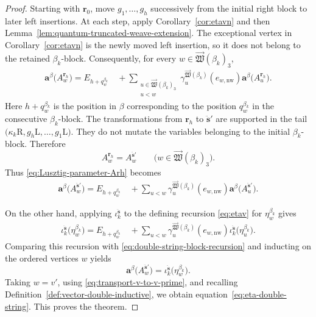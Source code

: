 \documentclass[12pt, reqno]{amsart}
\theoremstyle{plain}
\theoremstyle{definition}
\numberwithin{equation}{section}
\begin{document}
\begin{proof}
Starting with \(\mathbf r_0\), move
\(g_1,\ldots,g_h\) successively from the initial right block to
later left insertions. At each step, apply
Corollary~\ref{cor:etavn} and then
Lemma~\ref{lem:quantum-truncated-weave-extension}. The exceptional
vertex in Corollary~\ref{cor:etavn} is the newly moved left
insertion, so it does not belong to the retained \(\beta_k\)-block.
Consequently, for every
\(w\in\overrightarrow{\mathfrak W}(\beta_k)_3\),
\begin{equation}\label{eq:Lusztig-parameter-Arh}
\begin{aligned}
    \mathbf a^\beta\bigl(A_w^{\mathbf r_h}\bigr)
    =
    E_{h+q_w^{\beta_k}}\quad+
    \sum_{\substack{
        u\in\overrightarrow{\mathfrak W}(\beta_k)_3\\
        u<w
    }}
    \gamma_u^{\overrightarrow{\mathfrak W}(\beta_k)}
        (e_{w,\mathrm{nw}})
    \mathbf a^\beta\bigl(A_u^{\mathbf r_h}\bigr).
\end{aligned}
\end{equation}
Here \(h+q_w^{\beta_k}\) is the position in \(\beta\) corresponding
to the position \(q_w^{\beta_k}\) in the consecutive
\(\beta_k\)-block. The transformations from \(\mathbf r_h\) to
\(\ddot{\mathbf s}'\) are supported in the tail
\(
    \bigl(
       \kappa_k\mathrm R,
       g_h\mathrm L,\ldots,g_1\mathrm L
    \bigr).
\)
They do not mutate the variables belonging to the initial
\(\beta_k\)-block. Therefore
\[
    A_w^{\mathbf r_h}
    =
    A_w^{\ddot{\mathbf s}'}
    \qquad
    \bigl(
      w\in\overrightarrow{\mathfrak W}(\beta_k)_3
    \bigr).
\]
Thus \eqref{eq:Lusztig-parameter-Arh} becomes
\begin{equation}\label{eq:double-string-block-recursion}
\begin{aligned}
    \mathbf a^\beta\bigl(A_w^{\ddot{\mathbf s}'}\bigr)
    =
    E_{h+q_w^{\beta_k}} 
    \quad+
    \sum_{u<w}
    \gamma_u^{\overrightarrow{\mathfrak W}(\beta_k)}
        (e_{w,\mathrm{nw}})
    \mathbf a^\beta\bigl(A_u^{\ddot{\mathbf s}'}\bigr).
\end{aligned}
\end{equation}

On the other hand, applying
\(\iota_k^{\ddot{\mathbf s}}\) to the defining recursion
\eqref{eq:etav} for \(\eta_w^{\beta_k}\) gives
\[
\begin{aligned}
    \iota_k^{\ddot{\mathbf s}}
        \bigl(\eta_w^{\beta_k}\bigr)
    =
    E_{h+q_w^{\beta_k}} 
    \quad+
    \sum_{u<w}
    \gamma_u^{\overrightarrow{\mathfrak W}(\beta_k)}
        (e_{w,\mathrm{nw}})
    \iota_k^{\ddot{\mathbf s}}
        \bigl(\eta_u^{\beta_k}\bigr).
\end{aligned}
\]
Comparing this recursion with
\eqref{eq:double-string-block-recursion} and inducting on the
ordered vertices \(w\) yields
\[
    \mathbf a^\beta
        \bigl(A_w^{\ddot{\mathbf s}'}\bigr)
    =
    \iota_k^{\ddot{\mathbf s}}
        \bigl(\eta_w^{\beta_k}\bigr).
\]
Taking \(w=v'\), using
\eqref{eq:transport-v-to-v-prime}, and recalling
Definition~\ref{def:vector-double-inductive}, we obtain equation~\eqref{eq:eta-double-string}.
This proves the theorem.
\end{proof}
\end{document}
